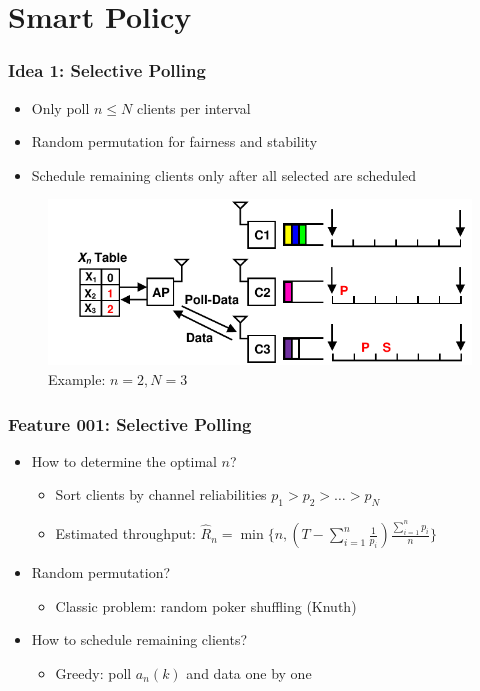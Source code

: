 \documentclass{beamer}
\begin{document}
\section{Smart Policy}

\begin{frame}
\frametitle{Idea 1: Selective Polling}
\begin{itemize}
\item Only poll $n \le N$ clients per interval
\item Random permutation for fairness and stability
\item Schedule remaining clients only after all selected are scheduled
\end{itemize}
\begin{figure}
\centering
\includegraphics[scale=0.8]{selective_1.pdf}
\caption{Example: $n=2, N=3$}
\end{figure}
\end{frame}


\begin{frame}
\frametitle{Feature 001: Selective Polling}
\begin{itemize}
\item How to determine the optimal $n$?
  \begin{itemize}
    \item Sort clients by channel reliabilities $p_1 > p_2 > \dots > p_N$
    \item Estimated throughput: $\hat{R}_n = \min\{n, (T-\sum_{i=1}^{n}\frac{1}{p_i})\frac{\sum_{i=1}^{n}p_i}{n} \}$
  \end{itemize}
\item Random permutation?
  \begin{itemize}
    \item Classic problem: random poker shuffling (Knuth)
  \end{itemize}
\item How to schedule remaining clients?
  \begin{itemize}
    \item Greedy: poll $a_n(k)$ and data one by one
  \end{itemize}
\end{itemize}
\end{frame}
\end{document}

